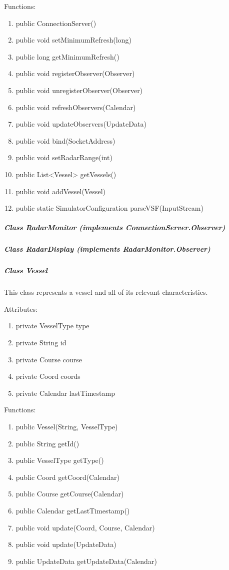 \documentclass{article}
\begin{document}
Functions:
\begin{enumerate}
	\item public ConnectionServer()
	\item public void setMinimumRefresh(long)
	\item public long getMinimumRefresh()
	\item public void registerObserver(Observer)
	\item public void unregisterObserver(Observer)
	\item public void refreshObservers(Calendar)
	\item public void updateObservers(UpdateData)
	\item public void bind(SocketAddress)
	\item public void setRadarRange(int)
	\item public List<Vessel> getVessels()
	\item public void addVessel(Vessel)
	\item public static SimulatorConfiguration parseVSF(InputStream)
\end{enumerate}

\subparagraph{Class RadarMonitor (implements ConnectionServer.Observer)} %

\subparagraph{Class RadarDisplay (implements RadarMonitor.Observer)} %

\subparagraph{Class Vessel}
This class represents a vessel and all of its relevant characteristics.

Attributes:
\begin{enumerate}
	\item private VesselType type
    \item private String id
    \item private Course course
    \item private Coord coords
    \item private Calendar lastTimestamp
\end {enumerate}

Functions:
\begin{enumerate}
	\item public Vessel(String, VesselType)
	\item public String getId()
	\item public VesselType getType()
	\item public Coord getCoord(Calendar)
	\item public Course getCourse(Calendar)
	\item public Calendar getLastTimestamp()
	\item public void update(Coord, Course, Calendar)
	\item public void update(UpdateData)
	\item public UpdateData getUpdateData(Calendar)
\end{enumerate}
\end{document}
